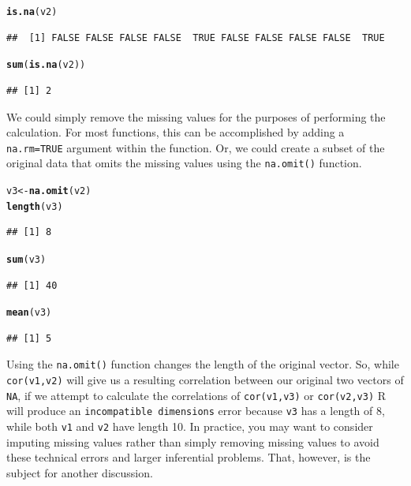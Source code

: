 \documentclass[12pt]{article}\usepackage[]{graphicx}\usepackage[]{color}
\makeatletter
\newcommand{\hlstd}[1]{\textcolor[rgb]{0.345,0.345,0.345}{#1}}%
\newcommand{\hlkwb}[1]{\textcolor[rgb]{0.69,0.353,0.396}{#1}}%
\newcommand{\hlkwd}[1]{\textcolor[rgb]{0.737,0.353,0.396}{\textbf{#1}}}%
\newenvironment{kframe}{%
 \def\at@end@of@kframe{}%
 \ifinner\ifhmode%
  \def\at@end@of@kframe{\end{minipage}}%
  \begin{minipage}{\columnwidth}%
 \fi\fi%
 \def\FrameCommand##1{\hskip\@totalleftmargin \hskip-\fboxsep
 \colorbox{shadecolor}{##1}\hskip-\fboxsep
     \hskip-\linewidth \hskip-\@totalleftmargin \hskip\columnwidth}%
 \MakeFramed {\advance\hsize-\width
   \@totalleftmargin\z@ \linewidth\hsize
   \@setminipage}}%
 {\par\unskip\endMakeFramed%
 \at@end@of@kframe}
\newenvironment{knitrout}{}{} %
\makeatother
\begin{document}
\begin{knitrout}
\color{fgcolor}\begin{kframe}
\begin{alltt}
\hlkwd{is.na}\hlstd{(v2)}
\end{alltt}
\begin{verbatim}
##  [1] FALSE FALSE FALSE FALSE  TRUE FALSE FALSE FALSE FALSE  TRUE
\end{verbatim}
\begin{alltt}
\hlkwd{sum}\hlstd{(}\hlkwd{is.na}\hlstd{(v2))}
\end{alltt}
\begin{verbatim}
## [1] 2
\end{verbatim}
\end{kframe}
\end{knitrout}

We could simply remove the missing values for the purposes of performing the calculation. For most functions, this can be accomplished by adding a \texttt{na.rm=TRUE} argument within the function. Or, we could create a subset of the original data that omits the missing values using the \texttt{na.omit()} function.

\begin{knitrout}
\color{fgcolor}\begin{kframe}
\begin{alltt}
\hlstd{v3} \hlkwb{<-} \hlkwd{na.omit}\hlstd{(v2)}
\hlkwd{length}\hlstd{(v3)}
\end{alltt}
\begin{verbatim}
## [1] 8
\end{verbatim}
\begin{alltt}
\hlkwd{sum}\hlstd{(v3)}
\end{alltt}
\begin{verbatim}
## [1] 40
\end{verbatim}
\begin{alltt}
\hlkwd{mean}\hlstd{(v3)}
\end{alltt}
\begin{verbatim}
## [1] 5
\end{verbatim}
\end{kframe}
\end{knitrout}

Using the \texttt{na.omit()} function changes the length of the original vector. So, while \texttt{cor(v1,v2)} will give us a resulting correlation between our original two vectors of \texttt{NA}, if we attempt to calculate the correlations of \texttt{cor(v1,v3)} or \texttt{cor(v2,v3)} R will produce an \texttt{incompatible dimensions} error because \texttt{v3} has a length of 8, while both \texttt{v1} and \texttt{v2} have length 10. In practice, you may want to consider imputing missing values rather than simply removing missing values to avoid these technical errors and larger inferential problems. That, however, is the subject for another discussion.
\end{document}
